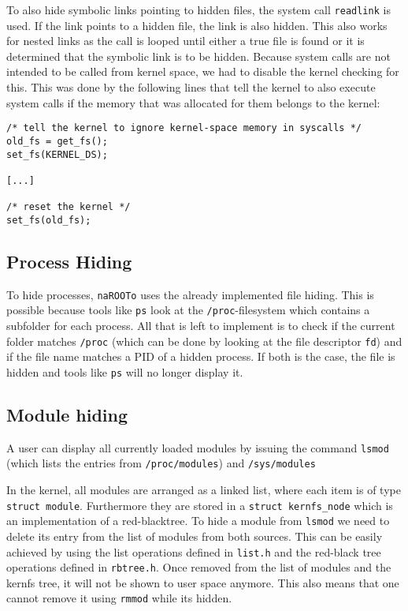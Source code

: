\documentclass[10pt, letterpaper]{scrartcl}
\begin{document}
To also hide symbolic links pointing to hidden files, the system call \texttt{readlink} is used.
If the link points to a hidden file, the link is also hidden.
This also works for nested links as the call is looped until either a true file is found or it is determined that the symbolic link is to be hidden.
Because system calls are not intended to be called from kernel space, we had to disable the kernel checking for this.
This was done by the following lines that tell the kernel to also execute system calls if the memory that was allocated for them belongs to the kernel:

\begin{verbatim}
/* tell the kernel to ignore kernel-space memory in syscalls */
old_fs = get_fs();
set_fs(KERNEL_DS);

[...]
	
/* reset the kernel */
set_fs(old_fs);
\end{verbatim}

\subsection{Process Hiding}
To hide processes, \texttt{naROOTo} uses the already implemented file hiding.
This is possible because tools like \texttt{ps} look at the \texttt{/proc}-filesystem which contains a subfolder for each process.
All that is left to implement is to check if the current folder matches \texttt{/proc} (which can be done by looking at the file descriptor \texttt{fd}) and if the file name matches a PID of a hidden process. If both is the case, the file is hidden and tools like \texttt{ps} will no longer display it.

\subsection{Module hiding}
A user can display all currently loaded modules by issuing the command \texttt{lsmod} (which lists the entries from \texttt{/proc/modules}) and \texttt{/sys/modules}

In the kernel, all modules are arranged as a linked list, where each item is of type \texttt{struct module}.
Furthermore they are stored in a \texttt{struct kernfs\_node} which is an implementation of a red-blacktree.
To hide a module from \texttt{lsmod} we need to delete its entry from the list of modules from both sources. 
This can be easily achieved by using the list operations defined in \texttt{list.h} and the red-black tree operations defined in \texttt{rbtree.h}.
Once removed from the list of modules and the kernfs tree, it will not be shown to user space anymore.
This also means that one cannot remove it using \texttt{rmmod} while its hidden.
\end{document}
